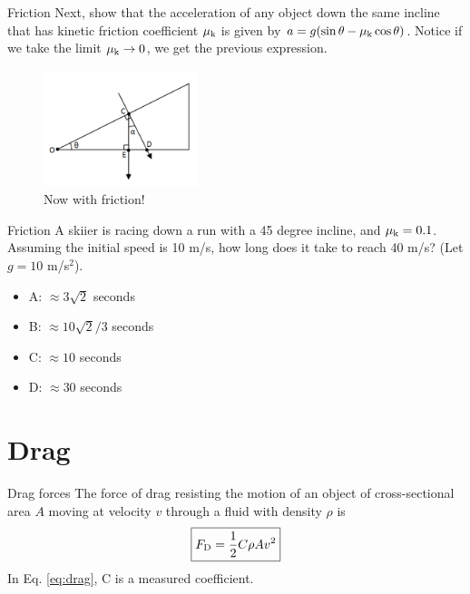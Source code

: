 \documentclass{beamer}
\begin{document}
\begin{frame}{Friction}
Next, show that the acceleration of any object down the same incline \alert{that has kinetic friction coefficient} $\mu_{\rm k} $ is given by $a = g(\sin\theta-\mu_{\rm k}\cos\theta)$.  Notice if we take the limit $\mu_{\rm k} \to 0$, we get the previous expression.
\begin{figure}
\centering
\includegraphics[width=0.4\textwidth]{figures/incline.png}
\caption{\label{fig:incline2} Now with friction!}
\end{figure}
\end{frame}

\begin{frame}{Friction}
A skiier is racing down a run with a 45 degree incline, and $\mu_{\rm k} = 0.1$.  Assuming the initial speed is 10 m/s, how long does it take to reach 40 m/s? (Let $g = 10$ m/s$^2$).
\begin{itemize}
\item A: $\approx 3\sqrt{2}$ seconds
\item B: $\approx 10\sqrt{2}/3$ seconds
\item C: $\approx 10$ seconds
\item D: $\approx 30$ seconds
\end{itemize}
\end{frame}

\section{Drag}

\begin{frame}{Drag forces}
\alert{The force of drag} resisting the motion of an object of cross-sectional area $A$ moving at velocity $v$ through a fluid with density $\rho$ is \\
\begin{equation}
\boxed{F_{\rm D} = \frac{1}{2}C\rho A v^2}
\label{eq:drag}
\end{equation}
In Eq. \ref{eq:drag}, C is a measured coefficient.
\end{frame}
\end{document}
